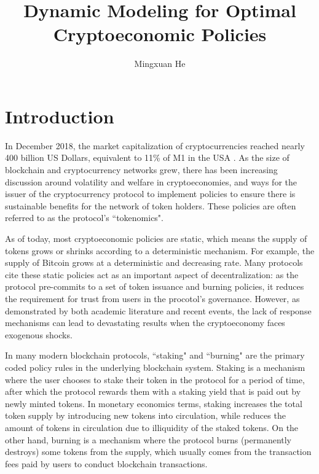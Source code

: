 \documentclass[12pt]{article}
\begin{document}
\title{Dynamic Modeling for Optimal Cryptoeconomic Policies}


\author{Mingxuan He\\
}

\maketitle 



\section{Introduction}
\label{sec:intro}
In December 2018, the market capitalization of cryptocurrencies reached nearly 400 billion US Dollars, equivalent to 11\% of M1 in the USA \parencite{schilling2019some}. As the size of blockchain and cryptocurrency networks grew, there has been increasing discussion around volatility and welfare in cryptoeconomies, and ways for the issuer of the cryptocurrency protocol to implement policies to ensure there is sustainable benefits for the network of token holders. These policies are often referred to as the protocol's ``tokenomics". 

As of today, most cryptoeconomic policies are static, which means the supply of tokens grows or shrinks according to a deterministic mechanism. For example, the supply of Bitcoin grows at a deterministic and decreasing rate. Many protocols cite these static policies act as an important aspect of decentralization: as the protocol pre-commits to a set of token issuance and burning policies, it reduces the requirement for trust from users in the procotol's governance. However, as demonstrated by both academic literature and recent events, the lack of response mechanisms can lead to devastating results when the cryptoeconomy faces exogenous shocks.

In many modern blockchain protocols, ``staking" and ``burning" are the primary coded policy rules in the underlying blockchain system. Staking is a mechanism where the user chooses to stake their token in the protocol for a period of time, after which the protocol rewards them with a staking yield that is paid out by newly minted tokens. In monetary economics terms, staking increases the total token supply by introducing new tokens into circulation, while reduces the amount of tokens in circulation due to illiquidity of the staked tokens. On the other hand, burning is a mechanism where the protocol burns (permanently destroys) some tokens from the supply, which usually comes from the transaction fees paid by users to conduct blockchain transactions.
\end{document}
